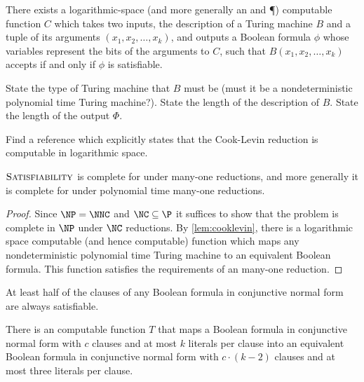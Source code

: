\documentclass[]{article}
\begin{document}
\begin{lemma}\label{lem:cooklevin}
  There exists a logarithmic-space (and more generally an \NC{} and \P) computable function $C$ which takes two inputs, the description of a Turing machine $B$ and a tuple of its arguments $(x_1, x_2, \dotsc, x_k)$, and outputs a Boolean formula $\phi$ whose variables represent the bits of the arguments to $C$, such that $B(x_1, x_2, \dotsc, x_k)$ accepts if and only if $\phi$ is satisfiable.
\end{lemma}

\begin{todo}
  State the type of Turing machine that $B$ must be (must it be a nondeterministic polynomial time Turing machine?).
  State the length of the description of $B$.
  State the length of the output $\Phi$.
\end{todo}

\begin{todo}
  Find a reference which explicitly states that the Cook-Levin reduction is computable in logarithmic space.
\end{todo}

\begin{lemma}\label{lem:satisnnccomplete}
  $\textsc{Satisfiability}$ is complete for \NNC{} under \NC{} many-one reductions, and more generally it is complete for \NP{} under polynomial time many-one reductions.
\end{lemma}
\begin{proof}
  Since $\NP = \NNC$ and $\NC \subseteq \P$ it suffices to show that the problem is complete in $\NP$ under $\NC$ reductions.
  By \autoref{lem:cooklevin}, there is a logarithmic space computable (and hence \NC{} computable) function which maps any nondeterministic polynomial time Turing machine to an equivalent Boolean formula.
  This function satisfies the requirements of an \NC{} many-one reduction.
\end{proof}

\begin{lemma}\label{lem:half}
 At least half of the clauses of any Boolean formula in conjunctive normal form are always satisfiable.
\end{lemma}

\begin{lemma}\label{lem:three}
  There is an \NC{} computable function $T$ that maps a Boolean formula in conjunctive normal form with $c$ clauses and at most $k$ literals per clause into an equivalent Boolean formula in conjunctive normal form with $c \cdot (k - 2)$ clauses and at most three literals per clause.
\end{lemma}
\end{document}
